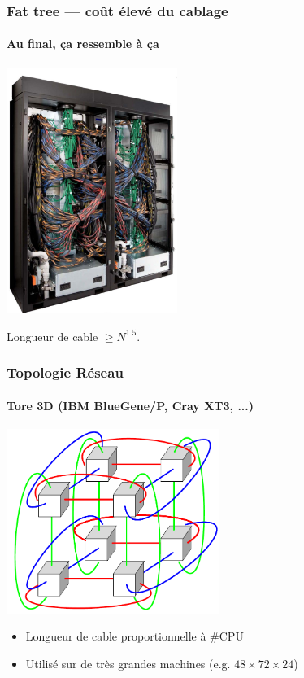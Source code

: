\documentclass[xcolor={x11names,svgnames}]{beamer}
\begin{document}

\begin{frame}
  \frametitle{Fat tree --- coût élevé du cablage}
  \framesubtitle{Au final, ça ressemble à ça}

  \centering
  \includegraphics[height=8cm]{wiring}

  \bigskip

  Longueur de cable $\geq N^{1.5}$.
\end{frame}



\begin{frame}
  \frametitle{Topologie Réseau}
  \framesubtitle{Tore 3D (IBM BlueGene/P, Cray XT3, ...)}

  \begin{center}
    \includegraphics[height=6cm]{2x2x2torus.pdf}
  \end{center}

  \begin{itemize}
  \item Longueur de cable proportionnelle à \#CPU
  \item Utilisé sur de très grandes machines (e.g. $48 \times 72 \times 24$)
  \end{itemize}
  
\end{frame}
\end{document}

